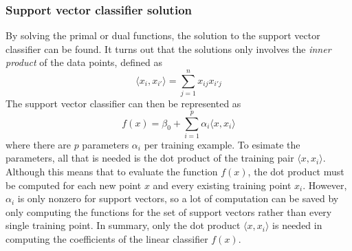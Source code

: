 \documentclass[CS5104-Notes.tex]{subfiles}
\begin{document}
\subsubsection{Support vector classifier solution}
By solving the primal or dual functions, the solution to the support vector classifier can be found. It turns out that the solutions only involves the \textit{inner product} of the data points, defined as
\begin{equation}
\langle x_{i}, x_{i'} \rangle = \sum_{j=1}^{n}x_{ij}x_{i'j}
\end{equation}
The support vector classifier can then be represented as
\begin{equation}
f(x) = \beta_{0} + \sum_{i=1}^{p}\alpha_{i}\langle x,x_{i} \rangle
\end{equation}
where there are $p$ parameters $\alpha_{i}$ per training example. To esimate the parameters, all that is needed is the dot product of the training pair $\langle x,x_{i} \rangle$. Although this means that to evaluate the function $f(x)$, the dot product must be computed for each new point $x$ and every existing training point $x_{i}$. However, $\alpha_{i}$ is only nonzero for support vectors, so a lot of computation can be saved by only computing the functions for the set of support vectors rather than every single training point.
\n
In summary, only the dot product $\langle x,x_{i} \rangle$ is needed in computing the coefficients of the linear classifier $f(x)$.
\end{document}
